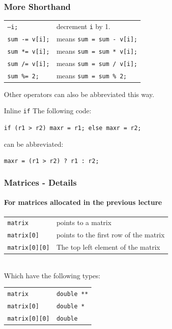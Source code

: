 \documentclass[table]{beamer}
\newif\ifschigh\schighfalse
\newcommand{\kw}[1]{\ifschigh\textcolor{red}{#1}\else\textcolor{keyword}{#1}\fi}
\begin{document}
\begin{frame}
\frametitle{More Shorthand}
\begin{tabular}{l l}
\tt --i;&decrement {\tt i} by 1.\\
\tt sum -= v[i];&means {\tt sum = sum - v[i];}\\
\tt sum *= v[i];&means {\tt sum = sum * v[i];}\\
\tt sum /= v[i];&means {\tt sum = sum / v[i];}\\
\tt sum \%= 2;&means {\tt sum = sum \% 2;}
\end{tabular}
Other operators can also be abbreviated this way.
\begin{exampleblock}{Inline {\tt if}}
The following code:
\begin{center}
\tt \kw{if} (r1 > r2) maxr = r1; \kw{else} maxr = r2;
\end{center}
can be abbreviated:
\begin{center}
\tt maxr = (r1 > r2) ? r1 : r2;
\end{center}
\end{exampleblock}
\end{frame}

\begin{frame}
\frametitle{Matrices - Details}
\framesubtitle{For matrices allocated in the previous lecture}
\begin{tabular}{l l}
\tt matrix & points to a matrix\\
\tt matrix[0]& points to the first row of the matrix\\
\tt matrix[0][0]&The top left element of the matrix
\end{tabular}\\
\vspace{0.2in}
Which have the following types:\\
\begin{tabular}{l l}
\tt matrix& \tt \kw{double} **\\
\tt matrix[0]&\tt \kw{double} *\\
\tt matrix[0][0]& \tt \kw{double}
\end{tabular}
\end{frame}
\end{document}
